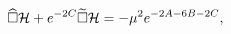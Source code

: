 \begin{equation}
\widehat{\square}{\cal H}+e^{-2C}\widetilde{\square}{\cal
H}=-\mu^2e^{-2A-6B-2C},
\end{equation}

